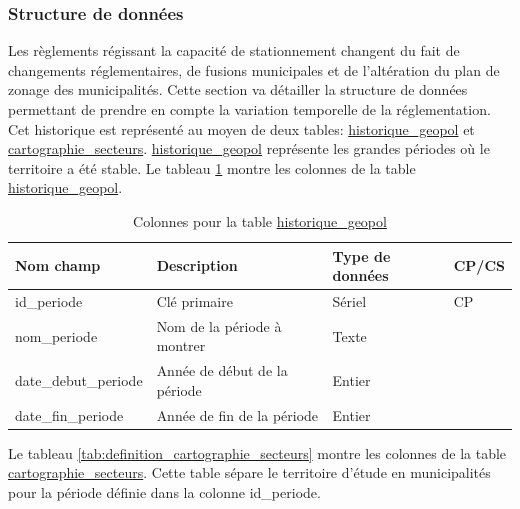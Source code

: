         \subsubsection{Structure de données}
            Les règlements régissant la capacité de stationnement changent du fait de changements réglementaires, de fusions municipales et de l'altération du plan de zonage des municipalités. Cette section va détailler la structure de données permettant de prendre en compte la variation temporelle de la réglementation. Cet historique est représenté au moyen de deux tables: \underline{historique\_geopol} et \underline{cartographie\_secteurs}. \underline{historique\_geopol} représente les grandes périodes où le territoire a été stable. 
            Le tableau \ref{tab:definition_historique_geopol} montre les colonnes de la table \ul{historique\_geopol}. \par
            \begin{table}[h]
                \caption{Colonnes pour la table \underline{historique\_geopol}}
                \label{tab:definition_historique_geopol}
                \centering
                \begin{tabular}{m{}|m{}m{}m{}}
                        \hline
                        Nom champ & Description & Type de données & CP/CS  \\
                        \hline
                        id\_periode & Clé primaire  & Sériel & CP \\ 
                        nom\_periode & Nom de la période à montrer & Texte & \\ 
                        date\_debut\_periode & Année de début de la période & Entier & \\ 
                        date\_fin\_periode & Année de fin de la période & Entier & \\ 
                        \hline
                \end{tabular}
            \end{table}\FloatBarrier
            Le tableau \ref{tab:definition_cartographie_secteurs} montre les colonnes de la table \underline{cartographie\_secteurs}. Cette table sépare le territoire d'étude en municipalités pour la période définie dans la colonne id\_periode.\par
